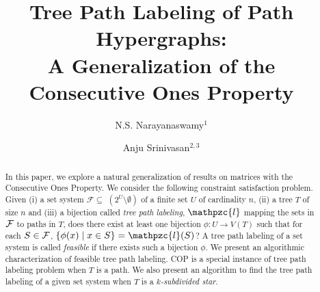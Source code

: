 \documentclass[11pt,letter]{../lib/llncs}
\def\cF{{\cal F}}
\def\F{{\mathcal F}}
\def\cl{\mathpzc{l}}
\begin{document}
\title{Tree Path Labeling of Path Hypergraphs:\\
  A Generalization of
  the Consecutive Ones Property} \author{N.S. Narayanaswamy$^1$ \and
  Anju Srinivasan$^{2,3}$}









\maketitle


\begin{abstract}
  In this paper, we explore a natural generalization of results on
  matrices with the Consecutive Ones Property.  We consider the
  following constraint satisfaction problem. Given (i) a set system
  $\F \subseteq$ $(2^{U} \setminus \emptyset)$ of a finite set $U$ of
  cardinality $n$, (ii) a tree $T$ of size $n$ and (iii) a bijection
  called {\em tree path labeling}, $\cl$ mapping the sets in
  $\cF$ to paths in $T$, does there exist at least one bijection
  $\phi:U \rightarrow V(T)$ such that for each $S \in \cF$, $\{\phi(x)
  \mid x \in S\} = \cl(S)$?  A tree path labeling of a set system is
  called {\em feasible} if there exists such a bijection $\phi$.  We
  present an algorithmic characterization of feasible tree path
  labeling. COP is a special instance
  of tree path labeling problem when $T$ is a path.  We also present
  an algorithm to find the tree path labeling of a given set system
  when $T$ is a {\em $k$-subdivided star}.
\end{abstract}
\end{document}
